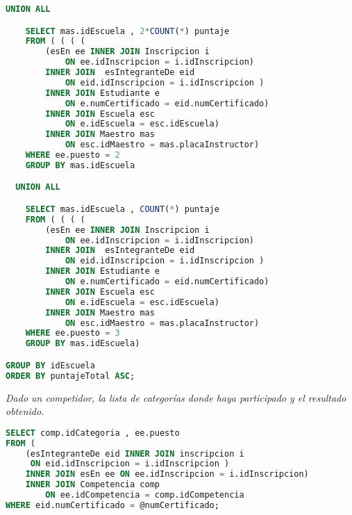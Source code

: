 \begin{lstlisting}[language=SQL]
  UNION ALL

    SELECT mas.idEscuela , 2*COUNT(*) puntaje
    FROM ( ( ( (
        (esEn ee INNER JOIN Inscripcion i
            ON ee.idInscripcion = i.idInscripcion)
        INNER JOIN  esIntegranteDe eid
            ON eid.idInscripcion = i.idInscripcion )
        INNER JOIN Estudiante e
            ON e.numCertificado = eid.numCertificado)
        INNER JOIN Escuela esc
            ON e.idEscuela = esc.idEscuela)
        INNER JOIN Maestro mas
            ON esc.idMaestro = mas.placaInstructor)
    WHERE ee.puesto = 2
    GROUP BY mas.idEscuela

  UNION ALL

    SELECT mas.idEscuela , COUNT(*) puntaje
    FROM ( ( ( (
        (esEn ee INNER JOIN Inscripcion i
            ON ee.idInscripcion = i.idInscripcion)
        INNER JOIN  esIntegranteDe eid
            ON eid.idInscripcion = i.idInscripcion )
        INNER JOIN Estudiante e
            ON e.numCertificado = eid.numCertificado)
        INNER JOIN Escuela esc
            ON e.idEscuela = esc.idEscuela)
        INNER JOIN Maestro mas
            ON esc.idMaestro = mas.placaInstructor)
    WHERE ee.puesto = 3
    GROUP BY mas.idEscuela)

GROUP BY idEscuela
ORDER BY puntajeTotal ASC;

\end{lstlisting}


\emph{Dado un competidor, la lista de categorías donde haya participado y el resultado obtenido.}
\begin{lstlisting}[language=SQL]
SELECT comp.idCategoria , ee.puesto
FROM (
    (esIntegranteDe eid INNER JOIN inscripcion i
     ON eid.idInscripcion = i.idInscripcion )
    INNER JOIN esEn ee ON ee.idInscripcion = i.idInscripcion)
    INNER JOIN Competencia comp
        ON ee.idCompetencia = comp.idCompetencia
WHERE eid.numCertificado = @numCertificado;
\end{lstlisting}



